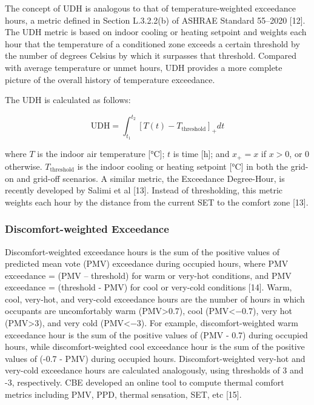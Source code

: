 The concept of UDH is analogous to that of temperature-weighted exceedance
hours, a metric defined in Section L.3.2.2(b) of ASHRAE Standard 55–2020 [12].
The UDH metric is based on indoor cooling or heating setpoint and weights each
hour that the temperature of a conditioned zone exceeds a certain threshold by
the number of degrees Celsius by which it surpasses that threshold. Compared
with average temperature or unmet hours, UDH provides a more complete picture of
the overall history of temperature exceedance.

The UDH is calculated as follows:

\begin{equation}\label{eq:udh}
\text{UDH} = \int_{t_1}^{t_2}[T(t) - T_{\text{threshold}}]_+dt
\end{equation}

where $T$ is the indoor air temperature [\si{\celsius}]; $t$ is time [h]; and $x_+ = x$
if $x > 0$, or 0 otherwise. $T_{\text{threshold}}$ is the indoor cooling or heating setpoint
[\si{\celsius}] in both the grid-on and grid-off scenarios. A similar metric, the
Exceedance Degree-Hour, is recently developed by Salimi et al [13]. Instead of
thresholding, this metric weights each hour by the distance from the current SET
to the comfort zone [13].

\subsubsection{Discomfort-weighted
Exceedance}\label{discomfort-weighted-exceedance}

Discomfort-weighted exceedance hours is the sum of the positive values of
predicted mean vote (PMV) exceedance during occupied hours, where PMV exceedance
= (PMV – threshold) for warm or very-hot conditions, and PMV exceedance =
(threshold - PMV) for cool or very-cold conditions [14]. Warm, cool, very-hot,
and very-cold exceedance hours are the number of hours in which occupants are
uncomfortably warm (PMV>0.7), cool (PMV<−0.7), very hot (PMV>3), and very cold
(PMV<−3). For example, discomfort-weighted warm exceedance hour is the sum of
the positive values of (PMV - 0.7) during occupied hours, while
discomfort-weighted cool exceedance hour is the sum of the positive values of
(-0.7 - PMV) during occupied hours. Discomfort-weighted very-hot and very-cold
exceedance hours are calculated analogously, using thresholds of 3 and -3,
respectively. CBE developed an online tool to compute thermal comfort metrics
including PMV, PPD, thermal sensation, SET, etc [15].


